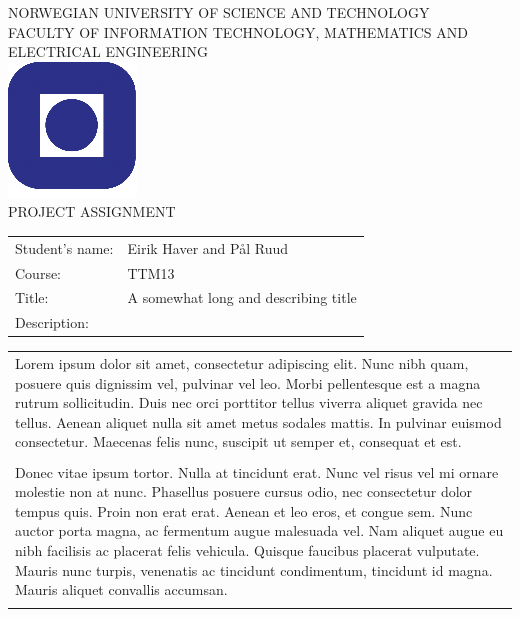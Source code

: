%
\begin{titlepage}
\begin{center}
\textsc{NORWEGIAN UNIVERSITY OF SCIENCE AND TECHNOLOGY\\
FACULTY OF  INFORMATION TECHNOLOGY, MATHEMATICS AND ELECTRICAL ENGINEERING} \\
\vspace{0.5cm} 
\includegraphics[scale=0.5]{NTNU-logo} \\

\vspace{1.0cm}
{\Huge{PROJECT ASSIGNMENT}}
\vspace{1.0cm}

\begin{tabular}{ p{4cm} p{11cm}}

Student's name:	& Eirik Haver and Pål Ruud \\
Course: & TTM13 \\
Title: & A somewhat long and describing title \\
Description: & \\
\end{tabular}
{\small{\begin{tabular}{p{15cm}}
\vspace{0.2cm}
Lorem ipsum dolor sit amet, consectetur adipiscing elit. Nunc nibh quam, posuere quis dignissim vel, pulvinar vel leo. Morbi pellentesque est a magna rutrum sollicitudin. Duis nec orci porttitor tellus viverra aliquet gravida nec tellus. Aenean aliquet nulla sit amet metus sodales mattis. In pulvinar euismod consectetur. Maecenas felis nunc, suscipit ut semper et, consequat et est. 
\\\\
Donec vitae ipsum tortor. Nulla at tincidunt erat. Nunc vel risus vel mi ornare molestie non at nunc. Phasellus posuere cursus odio, nec consectetur dolor tempus quis. Proin non erat erat. Aenean et leo eros, et congue sem. Nunc auctor porta magna, ac fermentum augue malesuada vel. Nam aliquet augue eu nibh facilisis ac placerat felis vehicula. Quisque faucibus placerat vulputate. Mauris nunc turpis, venenatis ac tincidunt condimentum, tincidunt id magna. Mauris aliquet convallis accumsan. 
\\\\
\end{tabular}  }}


\end{center}
\end{titlepage}
